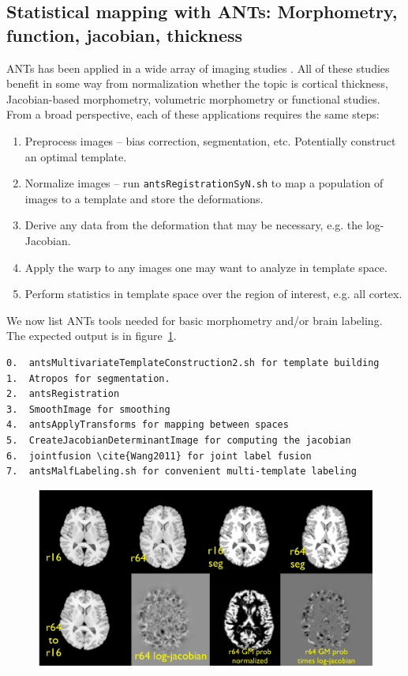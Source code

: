 \documentclass{InsightArticle}
\begin{document}
\subsection{Statistical mapping with ANTs: Morphometry, function, jacobian, thickness}
ANTs has been applied in a wide array of imaging studies
\cite{Avants2009a,Avants2009b,Avants2009,Das2009,Klein2009,Massimo2009,Pluta2008,Tustison2009,Yushkevich2009,Avants2008c,Avants2008b,M.Grossman10282008,Kim2008,Simon2008,Sun2008,Yushkevich2008,Aguirre2007,Avants2007,Avants2007i}.
All of these studies benefit in some way from normalization whether the topic is cortical
thickness, Jacobian-based morphometry, volumetric morphometry or functional studies. 
From a broad perspective, each of these applications requires the same steps:
\begin{enumerate}
\item Preprocess images -- bias correction, segmentation, etc.  Potentially construct an optimal template. 
\item Normalize images -- run \texttt{antsRegistrationSyN.sh} to map a population of images to a template and store the deformations. 
\item Derive any data from the deformation that may be necessary, e.g. the log-Jacobian.
\item Apply the warp to any images one may want to analyze in template space.  
\item Perform statistics in template space over the region of interest, e.g. all cortex. 
\end{enumerate}
We now list ANTs tools needed for basic morphometry and/or brain labeling.
The expected output is in figure~\ref{fig:morph}.
\begin{verbatim}
0.  antsMultivariateTemplateConstruction2.sh for template building
1.  Atropos for segmentation.
2.  antsRegistration
3.  SmoothImage for smoothing  
4.  antsApplyTransforms for mapping between spaces
5.  CreateJacobianDeterminantImage for computing the jacobian
6.  jointfusion \cite{Wang2011} for joint label fusion
7.  antsMalfLabeling.sh for convenient multi-template labeling
\end{verbatim}
\begin{figure}
\includegraphics[width=1\textwidth]{Figures/morphometry.pdf}
\label{fig:morph}
\end{figure}
\end{document}
